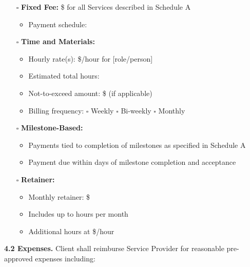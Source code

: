 \documentclass[11pt,a4paper]{article}
\begin{document}
\begin{itemize}
\item[$\square$] \textbf{Fixed Fee:} \$\underline{\hspace{4cm}} for all Services described in Schedule A
\begin{itemize}
\item Payment schedule: \underline{\hspace{8cm}}
\end{itemize}

\item[$\square$] \textbf{Time and Materials:}
\begin{itemize}
\item Hourly rate(s): \$\underline{\hspace{3cm}}/hour for [role/person]
\item Estimated total hours: \underline{\hspace{4cm}}
\item Not-to-exceed amount: \$\underline{\hspace{4cm}} (if applicable)
\item Billing frequency: $\square$ Weekly $\square$ Bi-weekly $\square$ Monthly
\end{itemize}

\item[$\square$] \textbf{Milestone-Based:}
\begin{itemize}
\item Payments tied to completion of milestones as specified in Schedule A
\item Payment due within \underline{\hspace{3cm}} days of milestone completion and acceptance
\end{itemize}

\item[$\square$] \textbf{Retainer:}
\begin{itemize}
\item Monthly retainer: \$\underline{\hspace{4cm}}
\item Includes up to \underline{\hspace{3cm}} hours per month
\item Additional hours at \$\underline{\hspace{3cm}}/hour
\end{itemize}
\end{itemize}

\textbf{4.2 Expenses.} Client shall reimburse Service Provider for reasonable pre-approved expenses including:
\end{document}
